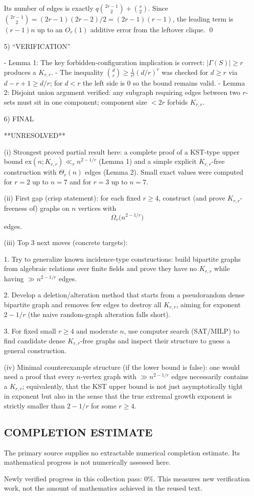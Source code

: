 Its number of edges is exactly $q\binom{2r-1}{2}+\binom{s}{2}$.
Since $\binom{2r-1}{2}=(2r-1)(2r-2)/2=(2r-1)(r-1)$, the leading term is $(r-1)n$ up to an $O_r(1)$ additive error from the leftover clique.
\qed

5) “VERIFICATION”

- Lemma 1: The key forbidden-configuration implication is correct: $|\Gamma(S)|\ge r$ produces a $K_{r,r}$.
- The inequality $\binom{d}{r}\ge \frac1{r!}(d/r)^r$ was checked for $d\ge r$ via $d-r+1\ge d/r$; for $d<r$ the left side is $0$ so the bound remains valid.
- Lemma 2: Disjoint union argument verified: any subgraph requiring edges between two $r$-sets must sit in one component; component size $<2r$ forbids $K_{r,r}$.

6) FINAL

**UNRESOLVED**

(i) Strongest proved partial result here: a complete proof of a KST-type upper bound $\mathrm{ex}(n;K_{r,r})\ll_r n^{2-1/r}$ (Lemma 1) and a simple explicit $K_{r,r}$-free construction with $\Theta_r(n)$ edges (Lemma 2). Small exact values were computed for $r=2$ up to $n=7$ and for $r=3$ up to $n=7$.

(ii) First gap (crisp statement): for each fixed $r\ge 4$, construct (and prove $K_{r,r}$-freeness of) graphs on $n$ vertices with
\[
\Omega_r\bigl(n^{2-1/r}\bigr)
\]
edges.

(iii) Top 3 next moves (concrete targets):

1. Try to generalize known incidence-type constructions: build bipartite graphs from algebraic relations over finite fields and prove they have no $K_{r,r}$ while having $\gg n^{2-1/r}$ edges.

2. Develop a deletion/alteration method that starts from a pseudorandom dense bipartite graph and removes few edges to destroy all $K_{r,r}$, aiming for exponent $2-1/r$ (the naive random-graph alteration falls short).

3. For fixed small $r\ge 4$ and moderate $n$, use computer search (SAT/MILP) to find candidate dense $K_{r,r}$-free graphs and inspect their structure to guess a general construction.

(iv) Minimal counterexample structure (if the lower bound is false): one would need a proof that every $n$-vertex graph with $\gg n^{2-1/r}$ edges necessarily contains a $K_{r,r}$; equivalently, that the KST upper bound is not just asymptotically tight in exponent but also in the sense that the true extremal growth exponent is strictly smaller than $2-1/r$ for some $r\ge 4$.




\subsection*{COMPLETION ESTIMATE}
The primary source supplies no extractable numerical completion estimate. Its mathematical progress is not numerically assessed here.

Newly verified progress in this collection pass: $0\%$. This measures new verification work, not the amount of mathematics achieved in the reused text.
